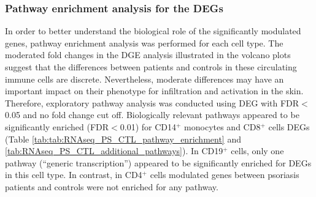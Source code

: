 \subsubsection{Pathway enrichment analysis for the DEGs}

In order to better understand the biological role of the significantly modulated genes, pathway enrichment analysis was performed for each cell type. The moderated fold changes in the DGE analysis illustrated in the volcano plots suggest that the differences between patients and controls in these circulating immune cells are discrete. Nevertheless, moderate differences may have an important impact on their phenotype for infiltration and activation in the skin. Therefore, exploratory pathway analysis was conducted using DEG with FDR$<$0.05 and no fold change cut off. Biologically relevant pathways appeared to be significantly enriched (FDR$<$0.01) for CD14$^+$ monocytes and CD8$^+$ cells DEGs (Table \ref{tab:tab:RNAseq_PS_CTL_pathway_enrichment} and \ref{tab:RNAseq_PS_CTL_additional_pathways}). In CD19$^+$ cells, only one pathway (“generic transcription”) appeared to be significantly enriched for DEGs in this cell type. In contrast, in CD4$^+$ cells modulated genes between psoriasis patients and controls were not enriched for any pathway. 

